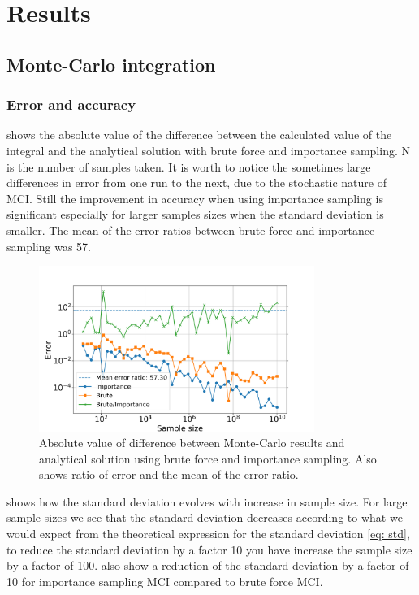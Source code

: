 \section{Results}

\subsection{Monte-Carlo integration}

\subsubsection{Error and accuracy}

 shows the absolute value of the difference between the
calculated value of the integral and the analytical solution with brute force
and importance sampling. N is the number of samples taken. It is worth to notice the sometimes
large differences in error from one run to the next, due to the stochastic nature of
MCI. Still the improvement in accuracy when using importance sampling
is significant especially for larger samples sizes when the standard
deviation is smaller. The mean of the error ratios between brute force and
importance sampling was 57.


\begin{figure}[H]
  \centering
  \includegraphics[width=0.8\textwidth]{../figures/mc_error.png}
  \caption{Absolute value of difference between Monte-Carlo results and analytical
  solution using brute force and importance sampling. Also shows ratio of error
  and the mean of the error ratio.}

  \label{fig:mc_error}
\end{figure}


 shows how the standard deviation evolves with increase in
sample size. For large sample sizes we see that the standard deviation decreases
according to what we would expect from the theoretical expression for the standard
deviation \cref{eq: std}, to reduce the standard deviation by a factor 10 you have increase the
sample size by a factor of 100.
 also show a reduction of the standard deviation by a
factor of 10 for importance sampling MCI compared to brute force MCI.

